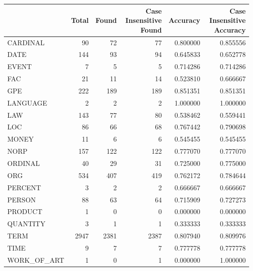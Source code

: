 \begin{tabular}{lrrrrr}
\toprule
 & Total & Found & Case Insensitive Found & Accuracy & Case Insensitive Accuracy \\
\midrule
CARDINAL & 90 & 72 & 77 & 0.800000 & 0.855556 \\
DATE & 144 & 93 & 94 & 0.645833 & 0.652778 \\
EVENT & 7 & 5 & 5 & 0.714286 & 0.714286 \\
FAC & 21 & 11 & 14 & 0.523810 & 0.666667 \\
GPE & 222 & 189 & 189 & 0.851351 & 0.851351 \\
LANGUAGE & 2 & 2 & 2 & 1.000000 & 1.000000 \\
LAW & 143 & 77 & 80 & 0.538462 & 0.559441 \\
LOC & 86 & 66 & 68 & 0.767442 & 0.790698 \\
MONEY & 11 & 6 & 6 & 0.545455 & 0.545455 \\
NORP & 157 & 122 & 122 & 0.777070 & 0.777070 \\
ORDINAL & 40 & 29 & 31 & 0.725000 & 0.775000 \\
ORG & 534 & 407 & 419 & 0.762172 & 0.784644 \\
PERCENT & 3 & 2 & 2 & 0.666667 & 0.666667 \\
PERSON & 88 & 63 & 64 & 0.715909 & 0.727273 \\
PRODUCT & 1 & 0 & 0 & 0.000000 & 0.000000 \\
QUANTITY & 3 & 1 & 1 & 0.333333 & 0.333333 \\
TERM & 2947 & 2381 & 2387 & 0.807940 & 0.809976 \\
TIME & 9 & 7 & 7 & 0.777778 & 0.777778 \\
WORK_OF_ART & 1 & 0 & 1 & 0.000000 & 1.000000 \\
\bottomrule
\end{tabular}
